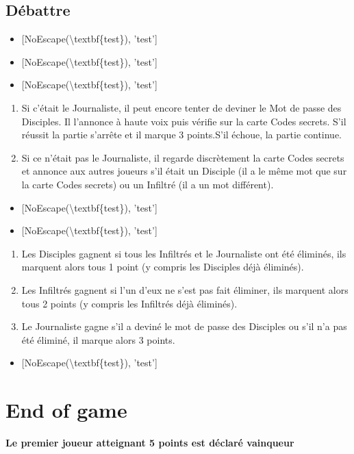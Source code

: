 \documentclass{article}%
\begin{document}
%
\subsection{ Débattre
}%
\label{subsec:Dbattre}%
\begin{itemize}%
\item%
{[}NoEscape(\textbackslash{}textbf\{test\}), 'test'{]}%
\item%
{[}NoEscape(\textbackslash{}textbf\{test\}), 'test'{]}%
\item%
{[}NoEscape(\textbackslash{}textbf\{test\}), 'test'{]}%
\end{itemize}%
\begin{enumerate}%
\item%
 Si c’était le Journaliste, il peut encore tenter de deviner le Mot de passe des Disciples. Il l'annonce à haute voix puis vérifie sur la carte Codes secrets. S’il réussit la partie s’arrête et il marque 3 points.S’il échoue, la partie continue.
%
\item%
 Si ce n’était pas le Journaliste, il regarde discrètement la carte Codes secrets et annonce aux autres joueurs s’il était un Disciple (il a le même mot que sur la carte Codes secrets) ou un Infiltré (il a un mot différent).
%
\end{enumerate}%
\begin{itemize}%
\item%
{[}NoEscape(\textbackslash{}textbf\{test\}), 'test'{]}%
\item%
{[}NoEscape(\textbackslash{}textbf\{test\}), 'test'{]}%
\end{itemize}%
\begin{enumerate}%
\item%
 Les Disciples gagnent si tous les Infiltrés et le Journaliste ont été éliminés, ils marquent alors tous 1 point (y compris les Disciples déjà éliminés).
%
\item%
 Les Infiltrés gagnent si l'un d'eux ne s'est pas fait éliminer, ils marquent alors tous 2 points (y compris les Infiltrés déjà éliminés).
%
\item%
 Le Journaliste gagne s'il a deviné le mot de passe des Disciples ou s'il n'a pas été éliminé, il marque alors 3 points.
%
\end{enumerate}%
\begin{itemize}%
\item%
{[}NoEscape(\textbackslash{}textbf\{test\}), 'test'{]}%
\end{itemize}

%
\section{ End of game
}%
\label{sec:Endofgame}%
\textbf{Le premier joueur atteignant 5 points est déclaré vainqueur}

%
\end{document}
